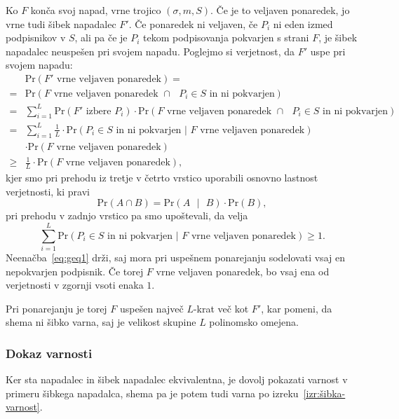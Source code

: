 \documentclass[isrm2, tisk]{fmfdelo}
\begin{document}
\begin{dokaz}
    Ko $F$ konča svoj napad, vrne trojico $(\sigma, m, S)$. Če je to veljaven ponaredek, jo vrne tudi
    šibek napadalec $F'$. Če ponaredek ni veljaven, če $P_i$ ni eden izmed podpisnikov v $S$, ali pa
    če je $P_i$ tekom podpisovanja pokvarjen s strani $F$, je šibek napadalec neuspešen pri svojem napadu.
    Poglejmo si verjetnost, da $F'$ uspe pri svojem napadu:
    \begin{align*}
          &\text{Pr}(\text{$F'$ vrne veljaven ponaredek}) = \\
        = &\text{Pr}(\text{$F$ vrne veljaven ponaredek } \cap \text{ $P_i \in S$ in ni pokvarjen}) \\
        = &\sum_{i=1}^L \text{Pr}(\text{$F'$ izbere $P_i$}) \cdot 
            \text{Pr}(\text{$F$ vrne veljaven ponaredek } \cap \text{ $P_i \in S$ in ni pokvarjen}) \\
        = &\sum_{i=1}^L \frac{1}{L} \cdot 
            \text{Pr}(\text{$P_i \in S$ in ni pokvarjen | $F$ vrne veljaven ponaredek}) \\
          &\cdot \text{Pr}(\text{$F$ vrne veljaven ponaredek}) \\
        \geq &\frac{1}{L} \cdot \text{Pr}(\text{$F$ vrne veljaven ponaredek}),
    \end{align*}
    kjer smo pri prehodu iz tretje v četrto vrstico uporabili osnovno lastnost verjetnosti, ki pravi
    $$
    \text{Pr}(A \cap B) = \text{Pr}(A \text{ }|\text{ } B) \cdot \text{Pr}(B),
    $$
    pri prehodu v zadnjo vrstico pa smo upoštevali, da velja
    \begin{equation}
    \label{eq:geq1}
    \sum_{i=1}^L \text{Pr}(\text{$P_i \in S$ in ni pokvarjen | $F$ vrne veljaven ponaredek}) \geq 1.
    \end{equation}
    Neenačba~\eqref{eq:geq1} drži, saj mora pri uspešnem ponarejanju sodelovati vsaj en nepokvarjen
    podpisnik. Če torej $F$ vrne veljaven ponaredek, bo vsaj ena od verjetnosti v zgornji vsoti enaka $1$.

    Pri ponarejanju je torej $F$ uspešen največ $L$-krat več kot $F'$, kar pomeni, da shema ni šibko
    varna, saj je velikost skupine $L$ polinomsko omejena.
\end{dokaz}

\subsubsection{Dokaz varnosti}
Ker sta napadalec in šibek napadalec ekvivalentna, je dovolj pokazati varnost v primeru šibkega
napadalca, shema pa je potem tudi varna po izreku~\ref{izr:šibka-varnost}.
\end{document}
